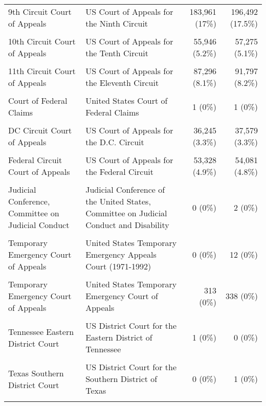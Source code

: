 \documentclass[10pt, letterpaper]{article}
\begin{document}
\begin{spacing}{1.0}
\begin{table}[H]
\begin{tabular}{p{1.75in}p{2.25in}rr}
        9th Circuit Court of Appeals & US Court of Appeals for the Ninth Circuit & 183,961 (17\%) & 196,492 (17.5\%)\\
        & & &\\[-6pt]
        10th Circuit Court of Appeals & US Court of Appeals for the Tenth Circuit & 55,946 (5.2\%) & 57,275 (5.1\%)\\
        & & &\\[-6pt]
        11th Circuit Court of Appeals & US Court of Appeals for the Eleventh Circuit & 87,296 (8.1\%) & 91,797 (8.2\%)\\
        & & &\\[-6pt]
        Court of Federal Claims & United States Court of Federal Claims & 1 (0\%) & 1 (0\%)\\
        & & &\\[-6pt]
        DC Circuit Court of Appeals & US Court of Appeals for the D.C. Circuit & 36,245 (3.3\%) & 37,579 (3.3\%)\\
        & & &\\[-6pt]
        Federal Circuit Court of Appeals & US Court of Appeals for the Federal Circuit & 53,328 (4.9\%) & 54,081 (4.8\%)\\
        & & &\\[-6pt]
        Judicial Conference, Committee on Judicial Conduct & Judicial Conference of the United States, Committee on Judicial Conduct and Disability & 0 (0\%) & 2 (0\%)\\
        & & &\\[-6pt]
        Temporary Emergency Court of Appeals & United States Temporary Emergency Appeals Court (1971-1992) & 0 (0\%) & 12 (0\%)\\
        & & &\\[-6pt]
        Temporary Emergency Court of Appeals & United States Temporary Emergency Court of Appeals & 313 (0\%) & 338 (0\%)\\
        & & &\\[-6pt]
        Tennessee Eastern District Court & US District Court for the Eastern District of Tennessee & 1 (0\%) & 0 (0\%)\\
        & & &\\[-6pt]
        Texas Southern District Court & US District Court for the Southern District of Texas & 0 (0\%) & 1 (0\%)\\[4pt]
        \hline\\
    \end{tabular}
    \label{tab:distCourt}
\end{table}


\end{spacing}
\end{document}
